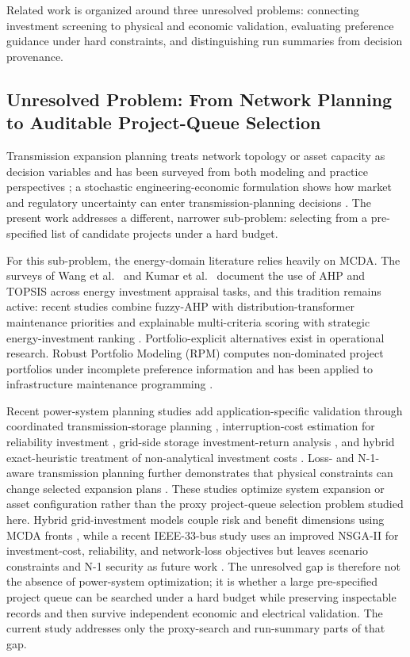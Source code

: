 \documentclass[energies,article,submit,moreauthors]{Definitions/mdpi}
\begin{document}
Related work is organized around three unresolved problems: connecting investment screening to physical and economic validation, evaluating preference guidance under hard constraints, and distinguishing run summaries from decision provenance.

\subsection{Unresolved Problem: From Network Planning to Auditable Project-Queue Selection}\label{grid-investment-decisions-optimization-and-review-scoring}

Transmission expansion planning treats network topology or asset capacity as decision variables and has been surveyed from both modeling \cite{ref1} and practice perspectives \cite{ref2}; a stochastic engineering-economic formulation shows how market and regulatory uncertainty can enter transmission-planning decisions \cite{ref10}. The present work addresses a different, narrower sub-problem: selecting from a pre-specified list of candidate projects under a hard budget.

For this sub-problem, the energy-domain literature relies heavily on MCDA. The surveys of Wang et al.~\cite{ref3} and Kumar et al.~\cite{ref4} document the use of AHP and TOPSIS across energy investment appraisal tasks, and this tradition remains active: recent studies combine fuzzy-AHP with distribution-transformer maintenance priorities \cite{ref5} and explainable multi-criteria scoring with strategic energy-investment ranking \cite{ref33}. Portfolio-explicit alternatives exist in operational research. Robust Portfolio Modeling (RPM) computes non-dominated project portfolios under incomplete preference information \cite{ref6} and has been applied to infrastructure maintenance programming \cite{ref7}.

Recent power-system planning studies add application-specific validation through coordinated transmission-storage planning \cite{ref29}, interruption-cost estimation for reliability investment \cite{ref30}, grid-side storage investment-return analysis \cite{ref31}, and hybrid exact-heuristic treatment of non-analytical investment costs \cite{ref32}. Loss- and N-1-aware transmission planning further demonstrates that physical constraints can change selected expansion plans \cite{ref34}. These studies optimize system expansion or asset configuration rather than the proxy project-queue selection problem studied here. Hybrid grid-investment models couple risk and benefit dimensions using MCDA fronts \cite{ref11}, while a recent IEEE-33-bus study uses an improved NSGA-II for investment-cost, reliability, and network-loss objectives but leaves scenario constraints and N-1 security as future work \cite{ref35}. The unresolved gap is therefore not the absence of power-system optimization; it is whether a large pre-specified project queue can be searched under a hard budget while preserving inspectable records and then survive independent economic and electrical validation. The current study addresses only the proxy-search and run-summary parts of that gap.
\end{document}

